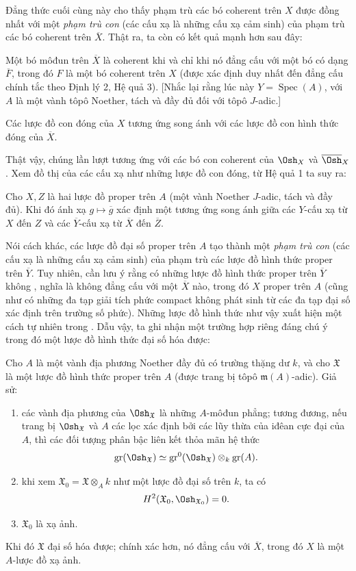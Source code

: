 Đẳng thức cuối cùng này cho thấy phạm trù các bó coherent trên $X$ được đồng
nhất với một \emph{phạm trù con} (các cấu xạ là những cấu xạ cảm sinh) của
phạm trù các bó coherent trên $\overline X$. Thật ra, ta còn có kết quả mạnh
hơn sau đây:

 Một bó môđun trên $\overline X$ là coherent khi và chỉ khi
nó đẳng cấu với một bó có dạng $\overline F$, trong đó $F$ là một bó coherent
trên $X$ (được xác định duy nhất đến đẳng cấu chính tắc theo Định lý 2, Hệ quả
3). [Nhắc lại rằng lúc này $Y=\operatorname{Spec}(A)$, với $A$ là một vành
tôpô Noether, tách và đầy đủ đối với tôpô $J$-adic.]

 Các lược đồ con đóng của $X$ tương ứng song ánh với các
lược đồ con hình thức đóng của $\overline X$.

Thật vậy, chúng lần lượt tương ứng với các bó con coherent của $\Osh_X$ và
$\overline{\Osh}_X$. Xem đồ thị của các cấu xạ như những lược đồ con đóng, từ
Hệ quả 1 ta suy ra:

 Cho $X,Z$ là hai lược đồ proper trên $A$ (một vành Noether
$J$-adic, tách và đầy đủ). Khi đó ánh xạ
$g\longmapsto\overline g$ xác định một tương ứng song ánh giữa các $Y$-cấu xạ
từ $X$ đến $Z$ và các $\overline Y$-cấu xạ từ $\overline X$ đến
$\overline Z$.

Nói cách khác, các lược đồ đại số proper trên $A$ tạo thành một
\emph{phạm trù con} (các cấu xạ là những cấu xạ cảm sinh) của phạm trù các
lược đồ hình thức proper trên $\overline Y$. Tuy nhiên, cần lưu ý rằng có những
lược đồ hình thức proper trên $\overline Y$ không ,
nghĩa là không đẳng cấu với một $\overline X$ nào, trong đó $X$ proper trên
$A$ (cũng như có những đa tạp giải tích phức compact không phát sinh từ các đa
tạp đại số xác định trên trường số phức). Những lược đồ hình thức như vậy xuất
hiện một cách tự nhiên trong . Dẫu vậy, ta ghi nhận
một trường hợp riêng đáng chú ý trong đó một lược đồ hình thức đại số hóa được:

 Cho $A$ là một vành địa phương Noether đầy đủ có trường
thặng dư $k$, và cho $\mathfrak X$ là một lược đồ hình thức proper trên $A$
(được trang bị tôpô $\mathfrak m(A)$-adic). Giả sử:
\begin{enumerate}
  \item[\textit{i.}] các vành địa phương của $\Osh_{\mathfrak X}$ là những
    $A$-môđun phẳng; tương đương, nếu trang bị $\Osh_{\mathfrak X}$ và $A$
    các lọc xác định bởi các lũy thừa của iđêan cực đại của $A$, thì các đối
    tượng phân bậc liên kết thỏa mãn hệ thức
    \[
      \operatorname{gr}(\Osh_{\mathfrak X})
      \simeq
      \operatorname{gr}^{0}(\Osh_{\mathfrak X})
      \otimes_k\operatorname{gr}(A).
    \]
  \item[\textit{ii.}] khi xem
    $\mathfrak X_0=\mathfrak X\otimes_A k$ như một lược đồ đại số trên $k$,
    ta có
    \[
      H^2(\mathfrak X_0,\Osh_{\mathfrak X_0})=0.
    \]
  \item[\textit{iii.}] $\mathfrak X_0$ là xạ ảnh.
\end{enumerate}
Khi đó $\mathfrak X$ đại số hóa được; chính xác hơn, nó đẳng cấu với
$\overline X$, trong đó $X$ là một $A$-lược đồ xạ ảnh.

